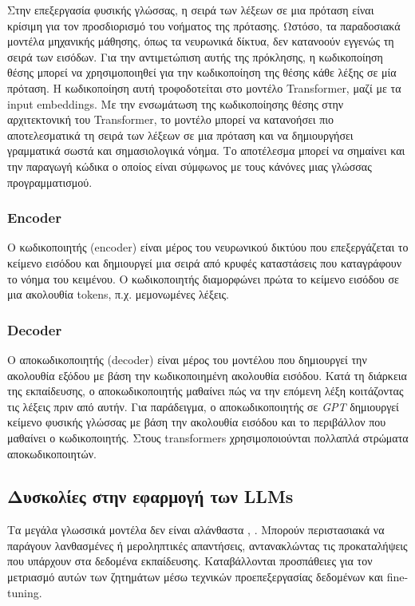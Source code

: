 \documentclass[12pt]{extarticle}
\begin{document}
Στην επεξεργασία φυσικής γλώσσας, η σειρά των λέξεων σε μια πρόταση είναι κρίσιμη για τον προσδιορισμό του νοήματος της πρότασης. Ωστόσο, τα παραδοσιακά μοντέλα μηχανικής μάθησης, όπως τα νευρωνικά δίκτυα, δεν κατανοούν εγγενώς τη σειρά των εισόδων. Για την αντιμετώπιση αυτής της πρόκλησης, η κωδικοποίηση θέσης μπορεί να χρησιμοποιηθεί για την κωδικοποίηση της θέσης κάθε λέξης σε μία πρόταση. Η κωδικοποίηση αυτή τροφοδοτείται στο μοντέλο Transformer, μαζί με τα input embeddings. Με την ενσωμάτωση της κωδικοποίησης θέσης στην αρχιτεκτονική του Transformer, το μοντέλο μπορεί να κατανοήσει πιο αποτελεσματικά τη σειρά των λέξεων σε μια πρόταση και να δημιουργήσει γραμματικά σωστά και σημασιολογικά νόημα.
Το  αποτέλεσμα μπορεί να σημαίνει και την παραγωγή κώδικα ο οποίος είναι 
σύμφωνος με τους κάνόνες μιας γλώσσας προγραμματισμού. 

\subsubsection{Encoder}

Ο κωδικοποιητής (encoder) είναι μέρος του νευρωνικού δικτύου που επεξεργάζεται το κείμενο εισόδου και δημιουργεί μια σειρά από κρυφές καταστάσεις που καταγράφουν το νόημα του κειμένου. Ο κωδικοποιητής διαμορφώνει πρώτα το κείμενο εισόδου σε μια ακολουθία tokens, π.χ. μεμονωμένες λέξεις.

\subsubsection{Decoder}
Ο αποκωδικοποιητής (decoder) είναι μέρος του μοντέλου που δημιουργεί την ακολουθία εξόδου με βάση την κωδικοποιημένη ακολουθία εισόδου. Κατά τη διάρκεια της εκπαίδευσης, ο αποκωδικοποιητής μαθαίνει πώς να  την επόμενη λέξη κοιτάζοντας τις λέξεις πριν από αυτήν. Για παράδειγμα, ο αποκωδικοποιητής σε \textit{GPT} δημιουργεί κείμενο φυσικής γλώσσας με βάση την ακολουθία εισόδου και το περιβάλλον που μαθαίνει ο κωδικοποιητής. Στους transformers χρησιμοποιούνται πολλαπλά στρώματα αποκωδικοποιητών.

\subsection{Δυσκολίες στην εφαρμογή των LLMs}

Τα μεγάλα γλωσσικά μοντέλα δεν είναι αλάνθαστα \cite{Raj2023}, \cite{Ruis2023}. Μπορούν περιστασιακά να παράγουν λανθασμένες ή μεροληπτικές απαντήσεις, αντανακλώντας τις προκαταλήψεις που υπάρχουν στα δεδομένα εκπαίδευσης. Καταβάλλονται προσπάθειες για τον μετριασμό αυτών των ζητημάτων μέσω τεχνικών προεπεξεργασίας δεδομένων και fine-tuning.
\end{document}
